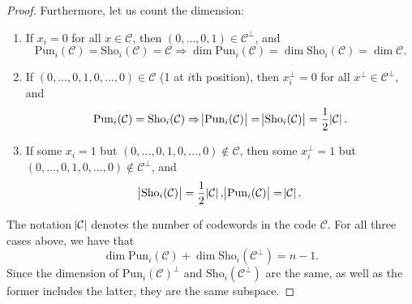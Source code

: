 \begin{proof}
    Furthermore, let us count the dimension:
    \begin{enumerate}[label=(A\arabic*)]
        \item \label{w6:A-1}
        If $x_i=0$ for all $x\in\mathcal{C}$, then $(0,\ldots,0,1)\in\mathcal{C}^\perp$, and
        \begin{equation*}
            \mathrm{Pun}_i(\mathcal{C}) = \mathrm{Sho}_i(\mathcal{C}) = \mathcal{C} \Rightarrow \dim\mathrm{Pun}_i(\mathcal{C}) = \dim\mathrm{Sho}_i(\mathcal{C}) = \dim\mathcal{C}.
        \end{equation*}
        \item \label{w6:A-2}
        If $(0,\ldots,0,1,0,\ldots,0)\in\mathcal{C}$ (1 at $i$th position), then $x^\perp_i=0$ for all $x^\perp\in\mathcal{C}^\perp$, and
        \begin{equation*}
            \mathrm{Pun}_i(\mathcal{C}) = \mathrm{Sho}_i(\mathcal{C})\Rightarrow 
            \abs{\mathrm{Pun}_i(\mathcal{C})} = \abs{\mathrm{Sho}_i(\mathcal{C})} = \frac{1}{2}\abs{\mathcal{C}}.
        \end{equation*}
        \item \label{w6:A-3}
        If some $x_i=1$ but $(0,\ldots,0,1,0,\ldots,0)\not\in\mathcal{C}$, then some $x^\perp_i=1$ but $(0,\ldots,0,1,0,\ldots,0)\not\in\mathcal{C}^\perp$, and
        \begin{equation*}
            \abs{\mathrm{Sho}_i(\mathcal{C})} = \frac{1}{2}\abs{\mathcal{C}}, \abs{\mathrm{Pun}_i(\mathcal{C})} = \abs{\mathcal{C}}.
        \end{equation*}
    \end{enumerate}
    The notation $\abs{\mathcal{C}}$ denotes the number of codewords in the code $\mathcal{C}$. For all three cases above, we have that
    \begin{equation*}
        \dim\mathrm{Pun}_i(\mathcal{C}) + \dim\mathrm{Sho}_i(\mathcal{C}^\perp) = n-1.
    \end{equation*}    
    Since the dimension of $\mathrm{Pun}_i(\mathcal{C})^\perp$ and $\mathrm{Sho}_i(\mathcal{C}^\perp)$ are the same, as well as the former includes the latter, they are the same subspace.
\end{proof}

